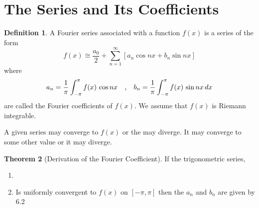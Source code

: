 \documentclass[12pt,a4paper]{report}
\theoremstyle{definition}
\newtheorem{thm}{Theorem}[section]
\newtheorem{defn}[thm]{Definition}
\theoremstyle{plain}
\begin{document}
\section{The Series and Its Coefficients}

\begin{defn}
A Fourier series associated with a function $f(x)$ is a series of the form 
\begin{equation}
f(x) \cong \frac{a_0}{2} + \sum^{\infty}_{n = 1} \left[a_n \cos nx + b_n \sin nx\right] 
\end{equation}
where
\begin{equation}
a_n  = \frac{1}{\pi}\int^{\pi}_{-\pi} f(x)\, \cos nx\, \hspace{0.3cm}\text{,}\,\hspace{0.3cm} b_n = \frac{1}{\pi}\int^{\pi}_{-\pi} f(x)\, \sin nx\, dx
\end{equation}
are called the Fourier coefficients of $f(x)$. We assume that $f(x)$ is Riemann integrable.
\end{defn}






A given series may converge to $f(x)$ or the may diverge. It may converge to some other value or it may diverge.



\begin{thm}[Derivation of the Fourier Coefficient]
If the trigonometric series,
\begin{enumerate}
\item[(i).]
\item[(ii).] Is uniformly convergent to $f(x)$ on $[-\pi, \pi]$ then the $a_n$ and $b_n$ are given by 6.2
\end{enumerate}
\end{thm}
\end{document}
